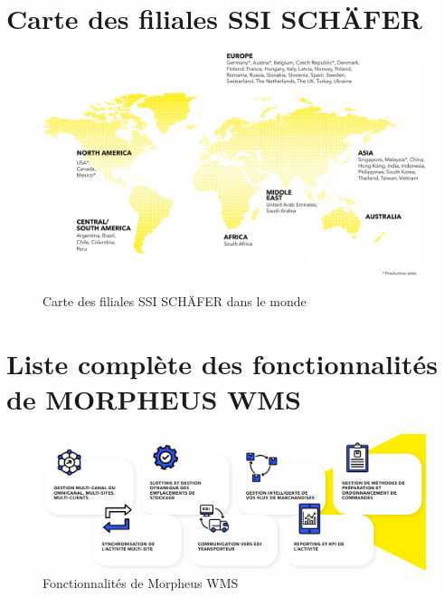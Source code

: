 \documentclass[a4paper, 12pt, french]{article}
\begin{document}
		\section{Carte des filiales SSI SCHÄFER}\label{appendix:map}
			\begin{figure}[h!]
				\begin{center}
					\includegraphics[width=\linewidth]{images/world_map.jpg}
					\caption{Carte des filiales SSI SCHÄFER dans le monde}%
					\label{fig:world_map}
				\end{center}
			\end{figure}
			
		\newpage

		\section{Liste complète des fonctionnalités de MORPHEUS WMS}\label{appendix:morpheusWMSFonctionnalites}
			\begin{figure}[h!]
					\includegraphics[width=\linewidth]{images/morpheus_wms_fonctionnalites.png}
					\caption{Fonctionnalités de Morpheus WMS}%
					\label{fig:morpheus_wms_fonctionnalites}
			\end{figure}
\end{document}
